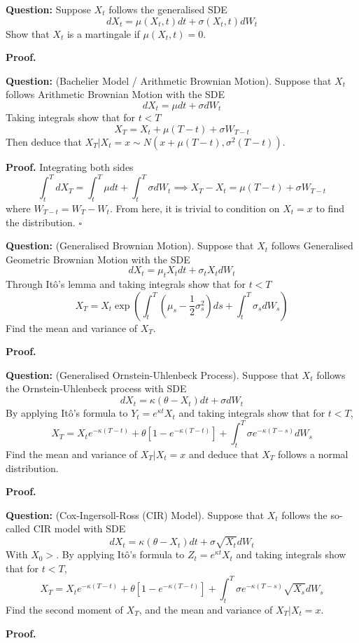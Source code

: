 \documentclass{article}
\begin{document}
\begin{tcolorbox}[colframe=black,colback=gray!5,boxrule=0.5pt]
\textbf{Question:} Suppose $X_t$ follows the generalised SDE 
$$dX_t = \mu(X_t,t)dt + \sigma(X_t,t)dW_t$$
Show that $X_t$ is a martingale if $\mu(X_t,t)=0.$
\end{tcolorbox}
\textbf{Proof.}


\begin{tcolorbox}[colframe=black,colback=gray!5,boxrule=0.5pt]
\textbf{Question:} (Bachelier Model / Arithmetic Brownian Motion). Suppose that $X_t$ follows Arithmetic Brownian Motion with the SDE
$$dX_t = \mu dt + \sigma dW_t$$
Taking integrals show that for $t<T$
$$X_T = X_t + \mu(T-t)+\sigma W_{T-t}$$
Then deduce that $X_T|X_t=x\sim N(x+\mu(T-t),\sigma^2(T-t)).$
\end{tcolorbox}
\textbf{Proof.} Integrating both sides 
$$\int_t^TdX_T = \int_t^T\mu dt + \int_t^T\sigma dW_t \implies X_T-X_t=\mu(T-t)+\sigma W_{T-t}$$
where $W_{T-t} = W_T- W_t$. From here, it is trivial to condition on $X_t=x$ to find the distribution. $\square$


\begin{tcolorbox}[colframe=black,colback=gray!5,boxrule=0.5pt]
\textbf{Question:} (Generalised Brownian Motion). Suppose that $X_t$ follows Generalised Geometric Brownian Motion with the SDE
$$dX_t = \mu_tX_tdt + \sigma_tX_t dW_t$$
Through Itô's lemma and taking integrals show that for $t<T$
$$X_T = X_t\exp\left(\int_t^T\left(\mu_s-\frac{1}{2}\sigma_s^2\right)ds + \int_t^T\sigma_s dW_s\right)$$
Find the mean and variance of $X_T$.
\end{tcolorbox}
\textbf{Proof.}


\begin{tcolorbox}[colframe=black,colback=gray!5,boxrule=0.5pt]
\textbf{Question:} (Generalised Ornstein-Uhlenbeck Process). Suppose that $X_t$ follows the Ornstein-Uhlenbeck process with SDE
$$dX_t = \kappa(\theta-X_t)dt + \sigma dW_t$$
By applying Itô's formula to $Y_t=e^{\kappa t}X_t$ and taking integrals show that for $t<T$,
$$X_T = X_te^{-\kappa(T-t)}+\theta[1-e^{-\kappa(T-t)}] + \int_t^T\sigma e^{-\kappa(T-s)}dW_s$$
Find the mean and variance of $X_T | X_t=x$ and deduce that $X_T$ follows a normal distribution.
\end{tcolorbox}
\textbf{Proof.}


\begin{tcolorbox}[colframe=black,colback=gray!5,boxrule=0.5pt]
\textbf{Question:} (Cox-Ingersoll-Ross (CIR) Model). Suppose that $X_t$ follows the so-called CIR model with SDE
$$dX_t =\kappa(\theta-X_t)dt + \sigma\sqrt{X_t}dW_t$$
With $X_0>$. By applying Itô's formula to $Z_t=e^{\kappa t}X_t$ and taking integrals show that for $t<T$,
$$X_T = X_te^{-\kappa(T-t)}+\theta[1-e^{-\kappa(T-t)}] + \int_t^T\sigma e^{-\kappa(T-s)}\sqrt{X_s}dW_s$$
Find the second moment of $X_T$, and the mean and variance of $X_T | X_t=x$.
\end{tcolorbox}
\textbf{Proof.}
\end{document}
